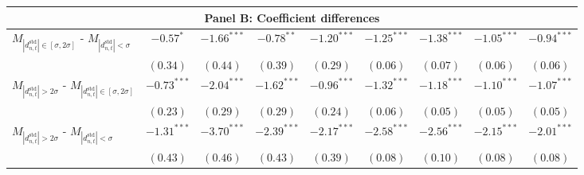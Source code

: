 \begin{tabular}{lcccccccc}
   \hline \multicolumn{9}{c}{Panel B: Coefficient differences} \\
 \hline 
$M_{|d^\text{std}_{n,t}| \in [\sigma, 2\sigma]}$ - $M_{|d^\text{std}_{n,t}| < \sigma}$ & $-0.57^{*}$ & $-1.66^{***}$ & $-0.78^{**}$ & $-1.20^{***}$ & $-1.25^{***}$ & $-1.38^{***}$ & $-1.05^{***}$ & $-0.94^{***}$ \\ 
   & $(0.34)$ & $(0.44)$ & $(0.39)$ & $(0.29)$ & $(0.06)$ & $(0.07)$ & $(0.06)$ & $(0.06)$ \\ 
  $M_{|d^\text{std}_{n,t}| > 2\sigma}$ - $M_{|d^\text{std}_{n,t}| \in [\sigma, 2\sigma]}$ & $-0.73^{***}$ & $-2.04^{***}$ & $-1.62^{***}$ & $-0.96^{***}$ & $-1.32^{***}$ & $-1.18^{***}$ & $-1.10^{***}$ & $-1.07^{***}$ \\ 
   & $(0.23)$ & $(0.29)$ & $(0.29)$ & $(0.24)$ & $(0.06)$ & $(0.05)$ & $(0.05)$ & $(0.05)$ \\ 
  $M_{|d^\text{std}_{n,t}| > 2\sigma}$ - $M_{|d^\text{std}_{n,t}| < \sigma}$ & $-1.31^{***}$ & $-3.70^{***}$ & $-2.39^{***}$ & $-2.17^{***}$ & $-2.58^{***}$ & $-2.56^{***}$ & $-2.15^{***}$ & $-2.01^{***}$ \\ 
   & $(0.43)$ & $(0.46)$ & $(0.43)$ & $(0.39)$ & $(0.08)$ & $(0.10)$ & $(0.08)$ & $(0.08)$ \\ 
   \hline 
\end{tabular}
